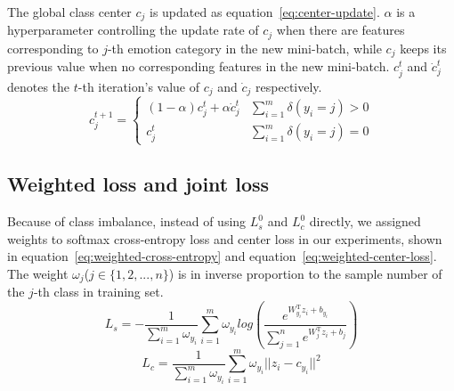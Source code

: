 \documentclass{article}
\begin{document}
The global class center $c_j$ is updated as equation~\ref{eq:center-update}. $\alpha$ is a hyperparameter controlling the update rate of $c_j$ when there are features corresponding to $j$-th emotion category in the new mini-batch, while $c_j$ keeps its previous value when no corresponding features in the new mini-batch. $c^t_j$ and $\dot{c}^t_j$ denotes the $t$-th iteration's value of  $c_j$ and $\dot{c}_j$ respectively.
\begin{equation} \label{eq:center-update}
c_j^{t+1}=\left\{
\begin{array}{lr}
(1 - \alpha) c_j^t + \alpha \dot{c}^t_j & \sum_{i=1}^{m}\delta(y_i = j) > 0 \\
c_j^t & \sum_{i=1}^{m}\delta(y_i = j) = 0
\end{array}
\right.
\end{equation}
\subsection{Weighted loss and joint loss}

Because of class imbalance, instead of using $L_s^0$ and $L_c^0$ directly, we assigned weights to softmax cross-entropy loss and center loss in our experiments, shown in equation~\ref{eq:weighted-cross-entropy} and equation~\ref{eq:weighted-center-loss}. The weight $\omega_j$($j \in \{1, 2, ... , n\}$)  is  in inverse proportion to the sample number of the $j$-th class in training set.
\begin{equation} \label{eq:weighted-cross-entropy}
L_s = - \frac{1}{\sum_{i=1}^{m}\omega_{y_i}}\sum_{i=1}^{m}{\omega_{y_i}log(\frac{e^{W_{y_i}^\mathrm{T}z_i+b_{y_i}}}{\sum_{j=1}^{n}e^{W_j^\mathrm{T}z_i+b_j}})}
\end{equation}
\begin{equation} \label{eq:weighted-center-loss}
L_c=\frac{1}{\sum_{i=1}^{m}\omega_{y_i}}\sum_{i=1}^{m}{\omega_{y_i}||z_i - c_{y_i}||^2}
\end{equation}
\end{document}
